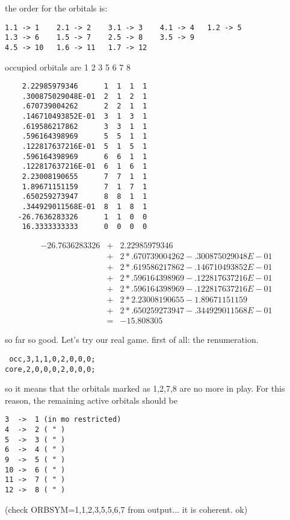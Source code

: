 \documentclass[a4paper,11pt]{report}
\begin{document}
the order for the orbitals is:
\begin{verbatim}
1.1 -> 1    2.1 -> 2    3.1 -> 3    4.1 -> 4   1.2 -> 5
1.3 -> 6    1.5 -> 7    2.5 -> 8    3.5 -> 9
4.5 -> 10   1.6 -> 11   1.7 -> 12
\end{verbatim}

occupied orbitals are 1 2 3 5 6 7 8 

\begin{verbatim}
    2.22985979346      1  1  1  1
    .300875029048E-01  2  1  2  1
    .670739004262      2  2  1  1
    .146710493852E-01  3  1  3  1 
    .619586217862      3  3  1  1
    .596164398969      5  5  1  1
    .122817637216E-01  5  1  5  1
    .596164398969      6  6  1  1  
    .122817637216E-01  6  1  6  1
    2.23008190655      7  7  1  1 
    1.89671151159      7  1  7  1
    .650259273947      8  8  1  1  
    .344929011568E-01  8  1  8  1
   -26.7636283326      1  1  0  0
    16.3333333333      0  0  0  0
\end{verbatim}

\begin{eqnarray}
-26.7636283326 & + & 2.22985979346 \\
 &+&2*.670739004262-.300875029048E-01 \\
 &+&2*.619586217862-.146710493852E-01 \\
 &+&2*.596164398969-.122817637216E-01 \\
 &+&2*.596164398969-.122817637216E-01 \\
 &+&2*2.23008190655-1.89671151159 \\
 &+&2*.650259273947-.344929011568E-01 \\
&=& -15.808305
\end{eqnarray}

so far so good. Let's try our real game.
first of all: the renumeration.

\begin{verbatim}
 occ,3,1,1,0,2,0,0,0;
core,2,0,0,0,2,0,0,0;
\end{verbatim}

so it means that the orbitals marked as 1,2,7,8 are no more in play.
For this reason, the remaining active orbitals should be

\begin{verbatim}
3  ->  1 (in mo restricted)
4  ->  2 ( " )
5  ->  3 ( " )
6  ->  4 ( " )
9  ->  5 ( " )
10 ->  6 ( " )
11 ->  7 ( " )
12 ->  8 ( " )
\end{verbatim}

(check ORBSYM=1,1,2,3,5,5,6,7 from output... it is coherent. ok)
\end{document}
